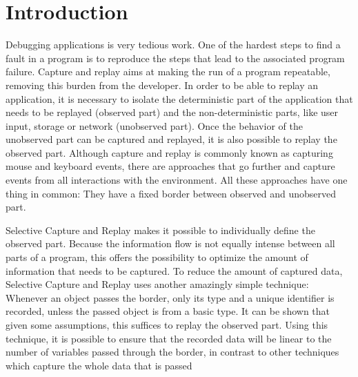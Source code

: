 \chapter{Introduction}
Debugging applications is very tedious work. One of the hardest steps to find a fault in a program is to reproduce the steps that lead to the associated program failure. Capture and replay aims at making the run of a program repeatable, removing this burden from the developer. In order to be able to replay an application, it is necessary to isolate the deterministic part of the application that needs to be replayed (observed part) and the non-deterministic parts, like user input, storage or network (unobserved part). Once the behavior of the unobserved part can be captured and replayed, it is also possible to replay the observed part. Although capture and replay is commonly known as capturing mouse and keyboard events, there are approaches that go further and capture events from all interactions with the environment. All these approaches have one thing in common: They have a fixed border between observed and unobserved part.

Selective Capture and Replay \cite{orso05may} makes it possible to individually define the observed part. Because the information flow is not equally intense between all parts of a program, this offers the possibility to optimize the amount of information that needs to be captured. To reduce the amount of captured data, Selective Capture and Replay uses another amazingly simple technique: Whenever an object passes the border, only its type and a unique identifier is recorded, unless the passed object is from a basic type. %
It can be shown that given some assumptions, this suffices to replay the observed part. Using this technique, it is possible to ensure that the recorded data will be linear to the number of variables passed through the border, in contrast to other techniques which capture the whole data that is passed

